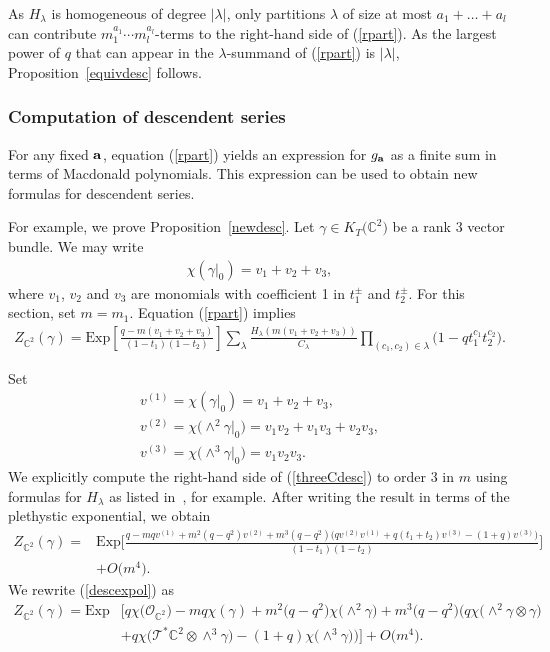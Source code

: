 \documentclass[10pt,a4paper]{amsart}
\numberwithin{equation}{section}
\newcommand{\Exp}{\mathrm{Exp}}
\def\C{\mathbb C}
\begin{document}
As $H_{\lambda}$ is homogeneous of degree $|\lambda|$, only partitions $\lambda$ of size at most $a_1+\dots+a_l$ can contribute $m_1^{a_1}\cdots m_l^{a_l}$-terms to the right-hand side of (\ref{rpart}). As the largest power of $q$ that can appear in the $\lambda$-summand of (\ref{rpart}) is $|\lambda|$, Proposition~\ref{equivdesc} follows.


\subsubsection{Computation of descendent series}\label{compdesc}

For any fixed ${\bf{a}}$, equation (\ref{rpart}) yields an expression for $g_{\bf{a}}$ as a finite sum in terms of Macdonald polynomials. This expression can be used to obtain new formulas for descendent series.

For example, we prove Proposition~\ref{newdesc}. Let $\gamma\in K_T\big(\C^2\big)$ be a rank $3$ vector bundle. We may write
\begin{gather*}
\chi(\gamma|_{0})= v_1+v_2+v_3,
\end{gather*}
where $v_1$, $v_2$ and $v_3$ are monomials with coefficient 1 in $t_1^{\pm}$ and $t_2^{\pm}$. For this section, set $m=m_1$. Equation (\ref{rpart}) implies
\begin{align}\label{threeCdesc} Z_{\C^2}(\gamma)=\Exp\left[\frac{q-m(v_1+v_2+v_3)}{(1-t_1)(1-t_2)}\right] \sum_{\lambda}\frac{H_{\lambda}(m(v_1+v_2+v_3))}{C_{\lambda}}\prod_{(c_1,c_2)\in \lambda}\big(1-qt_1^{c_1}t_2^{c_2}\big).\!\!\!
\end{align}

Set
\begin{gather*}
v^{(1)} = \chi(\gamma|_0)=v_1 + v_2 + v_3, \\
v^{(2)}=\chi\big({\wedge}^2 \gamma|_0\big)=v_1v_2+v_1v_3 + v_2v_3,\\
v^{(3)} =\chi\big({\wedge}^3 \gamma|_0\big)=v_1v_2v_3.
\end{gather*}
We explicitly compute the right-hand side of (\ref{threeCdesc}) to order $3$ in $m$ using formulas for $H_{\lambda}$ as listed in~\cite[Section~7.12]{OS}, for example. After writing the result in terms of the plethystic exponential, we obtain
\begin{align}
Z_{\C^2}(\gamma)\!=\!{}&\Exp\bigg[\frac{q\!-\!mqv^{(1)}\!\!+\!m^2(q\!-\!q^2)v^{(2)}\! +\!m^3(q\!-\!q^2)\big(qv^{(2)}v^{(1)}\! \!+\!q(t_1\!+\!t_2)v^{(3)}\!\!-\!(1\!+\!q)v^{(3)}\big) }{(1\!-\!t_1)(1\!-\!t_2)} \bigg] \nonumber
\\ \qquad
&+O\big(m^4\big).\label{descexpol}
\end{align}
We rewrite (\ref{descexpol}) as
\begin{align}
Z_{\C^2}(\gamma)=\Exp&\big[ q\chi\big(\mathcal{O}_{\C^2}\big)-mq\chi(\gamma)+m^2\big(q-q^2\big)\chi\big({\wedge}^2\gamma\big)
+m^3\big(q-q^2\big)\big(q\chi\big({\wedge}^2\gamma\otimes \gamma\big)\nonumber
\\
&+q\chi\big(\mathcal{T}^*\C^2\otimes\wedge^3\gamma\big)-(1+q)\chi \big({\wedge}^3\gamma\big)\big)\big]+ O\big(m^4\big).
\label{descexgeo}
\end{align}
\end{document}
